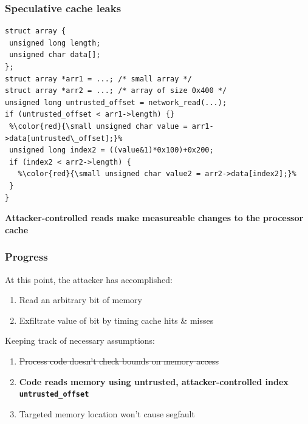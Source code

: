 \documentclass[10pt,handout]{beamer}
\begin{document}

\begin{frame}[fragile]

\frametitle{Speculative cache leaks}

\begin{lstlisting}[basicstyle=\small,style=customjava]
struct array {
 unsigned long length;
 unsigned char data[];
};
struct array *arr1 = ...; /* small array */
struct array *arr2 = ...; /* array of size 0x400 */
unsigned long untrusted_offset = network_read(...);
if (untrusted_offset < arr1->length) {}
 %\color{red}{\small unsigned char value = arr1->data[untrusted\_offset];}%
 unsigned long index2 = ((value&1)*0x100)+0x200;
 if (index2 < arr2->length) {
   %\color{red}{\small unsigned char value2 = arr2->data[index2];}%
 }
}
\end{lstlisting}

\begin{center}
\textbf{Attacker-controlled reads make measureable changes to the processor cache}
\end{center}

\end{frame}


\begin{frame}

\frametitle{Progress}

At this point, the attacker has accomplished:
\begin{enumerate}
  \item Read an arbitrary bit of memory
  \item Exfiltrate value of bit by timing cache hits \& misses \\[1em]
\end{enumerate}

Keeping track of necessary assumptions:
\begin{enumerate}
  \item \sout{Process code doesn't check bounds on memory access}
  \item \textbf{Code reads memory using untrusted, attacker-controlled index \texttt{untrusted\_offset}}
  \item Targeted memory location won't cause segfault
\end{enumerate}

\end{frame}

\end{document}
